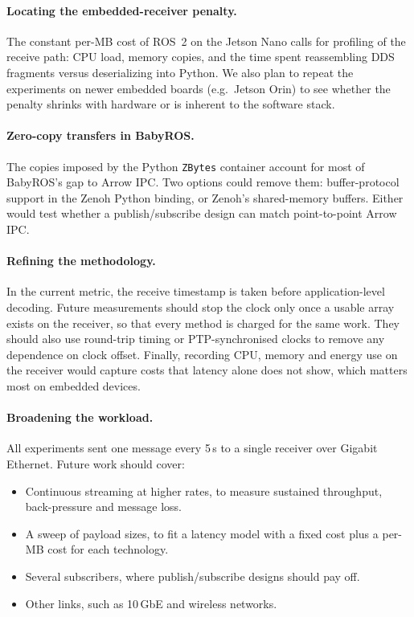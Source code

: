 \paragraph{Locating the embedded-receiver penalty.} The constant per-MB cost of ROS~2
on the Jetson Nano calls for profiling of the receive path: CPU load, memory copies,
and the time spent reassembling DDS fragments versus deserializing into Python. We
also plan to repeat the experiments on newer embedded boards (e.g.\ Jetson Orin) to
see whether the penalty shrinks with hardware or is inherent to the software stack.

\paragraph{Zero-copy transfers in BabyROS.} The copies imposed by the Python
\texttt{ZBytes} container account for most of BabyROS's gap to Arrow IPC. Two options
could remove them: buffer-protocol support in the Zenoh Python binding, or Zenoh's
shared-memory buffers. Either would test whether a publish/subscribe design can match
point-to-point Arrow IPC.

\paragraph{Refining the methodology.} In the current metric, the receive timestamp is
taken before application-level decoding. Future measurements should stop the clock
only once a usable array exists on the receiver, so that every method is charged for
the same work. They should also use round-trip timing or PTP-synchronised clocks to
remove any dependence on clock offset. Finally, recording CPU, memory and energy use
on the receiver would capture costs that latency alone does not show, which matters
most on embedded devices.

\paragraph{Broadening the workload.} All experiments sent one message every 5\,s to a
single receiver over Gigabit Ethernet. Future work should cover:
\begin{itemize}
  \item Continuous streaming at higher rates, to measure sustained throughput,
  back-pressure and message loss.
  \item A sweep of payload sizes, to fit a latency model with a fixed cost plus a
  per-MB cost for each technology.
  \item Several subscribers, where publish/subscribe designs should pay off.
  \item Other links, such as 10\,GbE and wireless networks.
\end{itemize}
